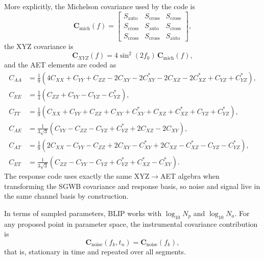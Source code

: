 \documentclass[11pt]{article}
\begin{document}
More explicitly, the Michelson covariance used by the code is
\begin{equation}
\mathbf{C}_{\mathrm{mich}}(f)=
\begin{bmatrix}
S_{\mathrm{auto}} & S_{\mathrm{cross}} & S_{\mathrm{cross}} \\
S_{\mathrm{cross}} & S_{\mathrm{auto}} & S_{\mathrm{cross}} \\
S_{\mathrm{cross}} & S_{\mathrm{cross}} & S_{\mathrm{auto}}
\end{bmatrix},
\end{equation}
the XYZ covariance is
\begin{equation}
\mathbf{C}_{XYZ}(f)=4\sin^2(2f_0)\,\mathbf{C}_{\mathrm{mich}}(f),
\end{equation}
and the AET elements are coded as
\begin{align}
C_{AA} &= \frac{1}{9}\left(4C_{XX}+C_{YY}+C_{ZZ}-2C_{XY}-2C_{XY}^{\ast}-2C_{XZ}-2C_{XZ}^{\ast}+C_{YZ}+C_{YZ}^{\ast}\right), \\
C_{EE} &= \frac{1}{3}\left(C_{ZZ}+C_{YY}-C_{YZ}-C_{YZ}^{\ast}\right), \\
C_{TT} &= \frac{1}{9}\left(C_{XX}+C_{YY}+C_{ZZ}+C_{XY}+C_{XY}^{\ast}+C_{XZ}+C_{XZ}^{\ast}+C_{YZ}+C_{YZ}^{\ast}\right), \\
C_{AE} &= \frac{1}{3\sqrt{3}}\left(C_{YY}-C_{ZZ}-C_{YZ}+C_{YZ}^{\ast}+2C_{XZ}-2C_{XY}\right), \\
C_{AT} &= \frac{1}{9}\left(2C_{XX}-C_{YY}-C_{ZZ}+2C_{XY}-C_{XY}^{\ast}+2C_{XZ}-C_{XZ}^{\ast}-C_{YZ}-C_{YZ}^{\ast}\right), \\
C_{ET} &= \frac{1}{3\sqrt{3}}\left(C_{ZZ}-C_{YY}-C_{YZ}+C_{YZ}^{\ast}+C_{XZ}^{\ast}-C_{XY}^{\ast}\right).
\end{align}
The response code uses exactly the same XYZ$\rightarrow$AET algebra when transforming the SGWB covariance and response basis, so noise and signal live in the same channel basis by construction.

In terms of sampled parameters, BLIP works with $\log_{10}N_p$ and $\log_{10}N_a$. For any proposed point in parameter space, the instrumental covariance contribution is
\begin{equation}
\mathbf{C}_{\mathrm{noise}}(f_k,t_n)=\mathbf{C}_{\mathrm{noise}}(f_k),
\end{equation}
that is, stationary in time and repeated over all segments.
\end{document}
